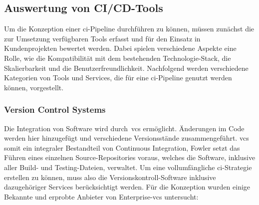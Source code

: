 \subsection{Auswertung von CI/CD-Tools} \label{subsec:03-concept-2}

Um die Konzeption einer \acrshort{ci}-Pipeline durchführen zu können, müssen zunächst die zur Umsetzung verfügbaren
Tools erfasst und für den Einsatz in Kundenprojekten bewertet werden.
Dabei spielen verschiedene Aspekte eine Rolle, wie die Kompatibilität mit dem bestehenden Technologie-Stack, die
Skalierbarkeit und die Benutzerfreundlichkeit.
Nachfolgend werden verschiedene Kategorien von Tools und Services, die für eine \acrshort{ci}-Pipeline genutzt werden
können, vorgestellt.

\subsubsection{Version Control Systems}

Die Integration von Software wird durch\ \acrshort{vcs} ermöglicht.
Änderungen im Code werden hier hinzugefügt und verschiedene Versionsstände zusammengeführt.
\acrshort{vcs} somit ein integraler Bestandteil von Continuous Integration, Fowler setzt das Führen eines einzelnen
Source-Repositories voraus, welches die Software, inklusive aller Build- und Testing-Dateien, verwaltet.
Um eine vollumfängliche \acrshort{ci}-Strategie erstellen zu können, muss also die Versionskontroll-Software
inklusive dazugehöriger Services berücksichtigt werden.
Für die Konzeption wurden einige Bekannte und erprobte Anbieter von Enterprise-\acrshort{vcs} untersucht:

